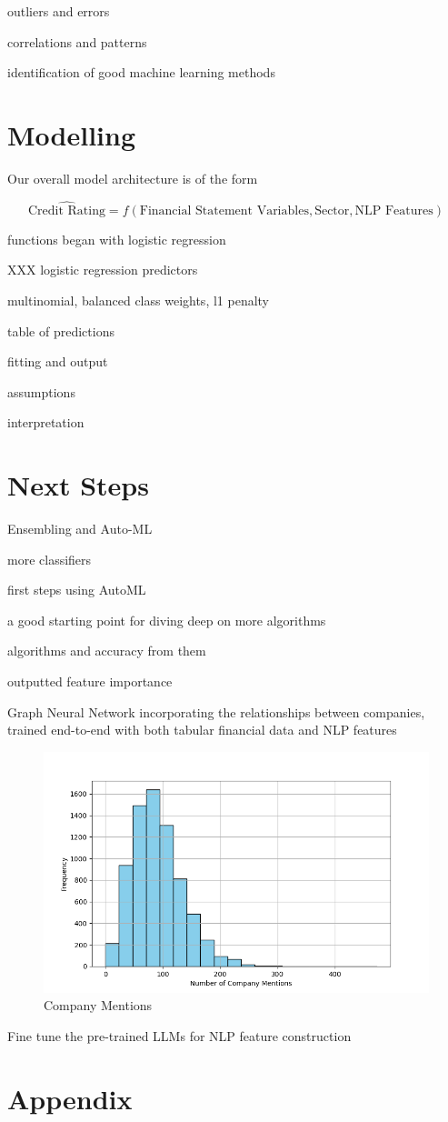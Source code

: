 \documentclass{article}
\begin{document}
    outliers and errors

    correlations and patterns

    identification of good machine learning methods

    \section*{Modelling}

    Our overall model architecture is of the form

    \begin{equation*}
        \hat{\text{Credit Rating}} = f(\text{Financial Statement Variables}, \text{Sector}, \text{NLP Features})
    \end{equation*}

    functions began with logistic regression

    XXX logistic regression predictors

    multinomial, balanced class weights, l1 penalty

    table of predictions

    fitting and output

    assumptions
    
    interpretation

    \section*{Next Steps}

    Ensembling and Auto-ML

    more classifiers
    
    first steps using AutoML

    a good starting point for diving deep on more algorithms

    algorithms and accuracy from them

    outputted feature importance

    Graph Neural Network incorporating the relationships between companies, trained end-to-end with both tabular financial data and NLP features
    
    \begin{figure}[h!]
		\centering
        \caption{Company Mentions}
        \includegraphics[width=0.5\linewidth,keepaspectratio=true]{../Output/All Data EDA/NLP EDA - NER on Company Names/Company Mentions Distribution No Title.png}
	\end{figure}

    Fine tune the pre-trained LLMs for NLP feature construction
    
    \clearpage
    \newpage

    
    

    \clearpage
    \newpage

    \appendix

    \section*{Appendix}
\end{document}
